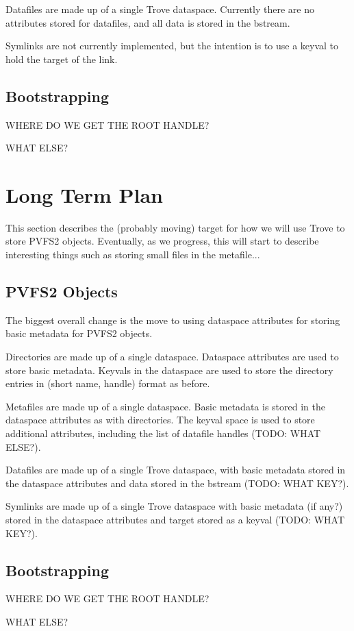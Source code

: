 \documentclass[10pt]{article} %
\begin{document}
Datafiles are made up of a single Trove dataspace.  Currently there are no
attributes stored for datafiles, and all data is stored in the bstream.

Symlinks are not currently implemented, but the intention is to use a keyval
to hold the target of the link.

\subsection{Bootstrapping}

WHERE DO WE GET THE ROOT HANDLE?

WHAT ELSE?

\section{Long Term Plan}

This section describes the (probably moving) target for how we will use Trove
to store PVFS2 objects.  Eventually, as we progress, this will start to
describe interesting things such as storing small files in the metafile...

\subsection{PVFS2 Objects}

The biggest overall change is the move to using dataspace attributes for
storing basic metadata for PVFS2 objects.

Directories are made up of a single dataspace.  Dataspace attributes are used
to store basic metadata.  Keyvals in the dataspace are used to store the
directory entries in (short name, handle) format as before.

Metafiles are made up of a single dataspace.  Basic metadata is stored in the
dataspace attributes as with directories.  The keyval space is used to store
additional attributes, including the list of datafile handles (TODO: WHAT
ELSE?).

Datafiles are made up of a single Trove dataspace, with basic metadata stored
in the dataspace attributes and data stored in the bstream (TODO: WHAT KEY?).

Symlinks are made up of a single Trove dataspace with basic metadata (if any?)
stored in the dataspace attributes and target stored as a keyval (TODO: WHAT KEY?).

\subsection{Bootstrapping}

WHERE DO WE GET THE ROOT HANDLE?

WHAT ELSE?
\end{document}
